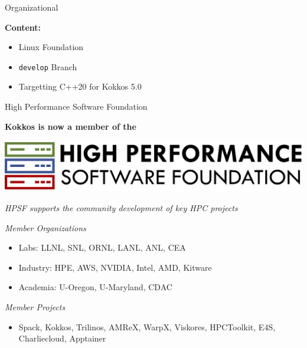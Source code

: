 

\begin{frame}[fragile]

  {\Huge Organizational}

  \vspace{10pt}

  \textbf{Content:}
  \begin{itemize}
    \item Linux Foundation
    \item{\texttt{develop} Branch}
    \item Targetting C++20 for Kokkos 5.0
  \end{itemize}

\end{frame}


\begin{frame}[fragile]{High Performance Software Foundation}
\begin{center}
\textbf{Kokkos is now a member of the}

\vspace{0.2cm}
\includegraphics[width=.45\textwidth]{4_4/hpsf-logo}

\vspace{0.2cm}
\textit{HPSF supports the community development of key HPC projects}
\end{center}

\textit{Member Organizations}
\begin{itemize}
  \item{Labs: LLNL, SNL, ORNL, LANL, ANL, CEA}
  \item{Industry: HPE, AWS, NVIDIA, Intel, AMD, Kitware}
  \item{Academia: U-Oregon, U-Maryland, CDAC}
\end{itemize}

\textit{Member Projects}
\begin{itemize}
  \item Spack, Kokkos, Trilinos, AMReX, WarpX, Viskores, HPCToolkit, E4S, Charliecloud, Apptainer
\end{itemize}
\end{frame}

